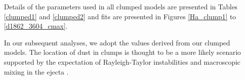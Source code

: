 \documentclass[useAMS,usenatbib,usegraphicx]{mnras}
\begin{document}
Details of the parameters used in all clumped models are
presented in Tables \ref{clumped1} and \ref{clumped2} and fits are presented in Figures \ref{Ha_clump1} to \ref{d1862_3604_cmax}.

In our subsequent analyses, we adopt the values derived from our clumped models.  The location of dust in clumps is thought to be a more likely scenario supported by the expectation of Rayleigh-Taylor instabilities and macroscopic mixing in the ejecta \cite{Lucy1991,Ercolano2007,Hammer2010}.


\end{document}
